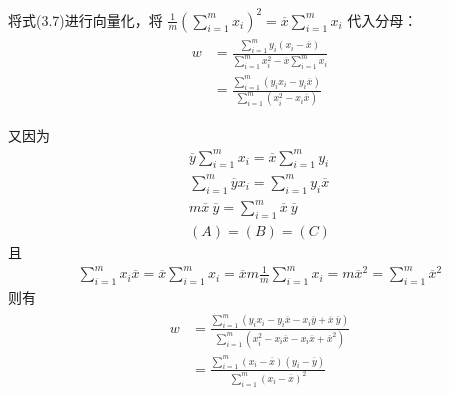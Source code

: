 \documentclass[../studies-ml.tex]{subfiles}
\begin{document}
\begin{anote}
  将式(3.7)进行向量化，将 $\frac{1}{m}(\sum\limits_{i=1}^{m} x_i)^2 = \overline{x}\sum\limits_{i=1}^{m} x_i$ 代入分母：
  \begin{align*}
    \begin{split}
      w & = \frac{\sum_{i=1}^{m}y_i(x_i-\overline{x})}{\sum_{i=1}^{m}x_i^2 - \overline{x}\sum_{i=1}^{m}x_i} \\
      & = \frac{\sum_{i=1}^{m}(y_i x_i- y_i \overline{x})}{\sum_{i=1}^{m}(x_i^2 - x_i \overline{x})}
    \end{split}
  \end{align*}

  又因为
  \begin{gather*}
    \overline{y}\sum_{i=1}^{m}x_i = \overline{x}\sum_{i=1}^{m}y_i \tag{A} \\
    \sum_{i=1}^{m}\overline{y}x_i = \sum_{i=1}^{m}y_i\overline{x} \tag{B} \\
    m\overline{x}\ \overline{y} = \sum_{i=1}^{m}\overline{x}\ \overline{y} \tag{C} \\
    (A) = (B) = (C)
  \end{gather*}
  且
  \begin{gather*}
    \sum_{i=1}^{m}x_i\overline{x} = \overline{x}\sum_{i=1}^{m}x_i =
    \overline{x}m\frac{1}{m}\sum_{i=1}^{m}x_i = m\overline{x}^2 =
    \sum_{i=1}^{m}\overline{x}^2
  \end{gather*}
  则有
  \begin{align*}
    \begin{split}
      w & = \frac{\sum\limits_{i=1}^m(y_i x_i - y_i \overline{x} - x_i \overline{y} + \overline{x}\ \overline{y})}
      {\sum\limits_{i=1}^m(x_i^2 - x_i\overline{x} - x_i\overline{x} + \overline{x}^2)} \\
      & = \frac{\sum\limits_{i=1}^{m}(x_i-\overline{x})(y_i-\overline{y})}{\sum\limits_{i=1}^{m}(x_i - \overline{x})^2}
    \end{split}
  \end{align*}


\end{anote}
\end{document}
